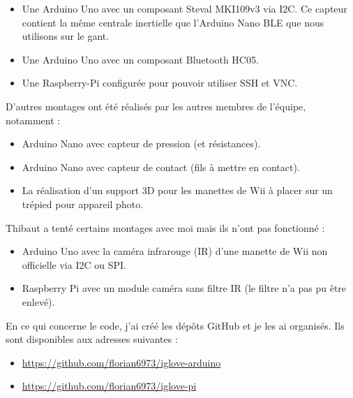 \documentclass[10pt]{article}
\begin{document}
            \begin{itemize}
                \item Une Arduino Uno avec un composant Steval MKI109v3 via I2C.
                    Ce capteur contient la même centrale inertielle que l'Arduino Nano BLE que nous utilisons sur le gant.
                \item Une Arduino Uno avec un composant Bluetooth HC05.
                \item Une Raspberry-Pi configurée pour pouvoir utiliser SSH et VNC.
            \end{itemize}

            D'autres montages ont été réalisés par les autres membres de l'équipe, notamment :
            \begin{itemize}
                \item Arduino Nano avec capteur de pression (et résistances).
                \item Arduino Nano avec capteur de contact (fils à mettre en contact).
                \item La réalisation d'un support 3D pour les manettes de Wii à placer sur un trépied pour appareil photo.
            \end{itemize}

            Thibaut a tenté certains montages avec moi mais ils n'ont pas fonctionné :
            \begin{itemize}
                \item Arduino Uno avec la caméra infrarouge (IR) d'une manette de Wii non officielle via I2C ou SPI.
                \item Raspberry Pi avec un module caméra sans filtre IR (le filtre n'a pas pu être enlevé).
            \end{itemize}

            En ce qui concerne le code, j'ai créé les dépôts GitHub et je les ai organisés. Ils sont disponibles aux adresses suivantes :
            \begin{itemize}
                \item \url{https://github.com/florian6973/iglove-arduino}
                \item \url{https://github.com/florian6973/iglove-pi}
            \end{itemize} 
            
\end{document}
